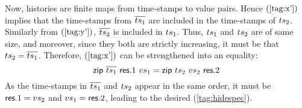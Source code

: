 %
Now, histories are finite maps from time-stamps to value pairs. Hence
$(\ref{tag:x'})$ implies that the time-stamps from $\overline{{ts}_1}$
are included in the time-stamps of ${ts}_2$. Similarly from
$(\ref{tag:y'})$, $\overline{{ts}_2}$ is included in ${ts}_1$. Thus,
${ts}_1$ and ${ts}_2$ are of same size, and moreover, since they both
are strictly increasing, it must be that ${ts}_2 =
\overline{{ts}_1}$. Therefore, $(\ref{tag:x'})$ can be strengthened
into an equality: 
%
\[
\mathsf{zip}~\overline{{ts}_1}~\mathsf{res}.1~{vs}_1 = \mathsf{zip}~{ts}_2~{vs}_2~\mathsf{res}.2
\]
%
As the time-stamps in $\overline{{ts}_1}$ and ${ts}_2$ appear
in the same order, it must be $\mathsf{res}.1 = {vs}_2$ and ${vs}_1 = \mathsf{res}.2$,
leading to the desired (\ref{tag:hidespec}).  
%



